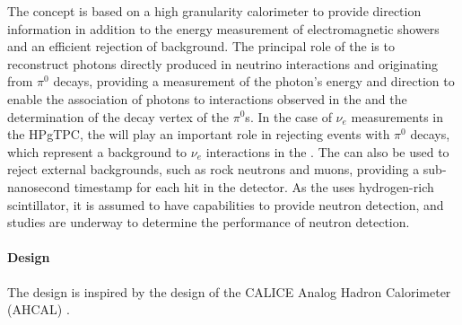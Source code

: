 The   concept is based on a high granularity calorimeter to provide direction information in addition to the energy measurement of electromagnetic showers and an efficient rejection of background. The principal role of the  is to reconstruct photons directly produced in neutrino interactions and originating from $\pi^0$ decays, providing a measurement of the photon's energy and direction to enable the association of photons to interactions observed in the  and the determination of the decay vertex of the $\pi^0$s. In the case of $\nu_e$ measurements in the HPgTPC, the  will play an important role in rejecting events with $\pi^0$ decays, which represent a background to $\nu_e$ interactions in the . The  can also be used to reject external backgrounds, such as rock neutrons and muons, providing a sub-nanosecond timestamp \cite{Simon:2013zya} for each hit in the detector. As the  uses hydrogen-rich scintillator, it is assumed to have capabilities to provide neutron detection, and studies are underway to determine the performance of neutron detection.

\paragraph{ Design}

The  design is inspired by the design of the CALICE Analog Hadron Calorimeter (AHCAL) \cite{collaboration:2010hb}. %

